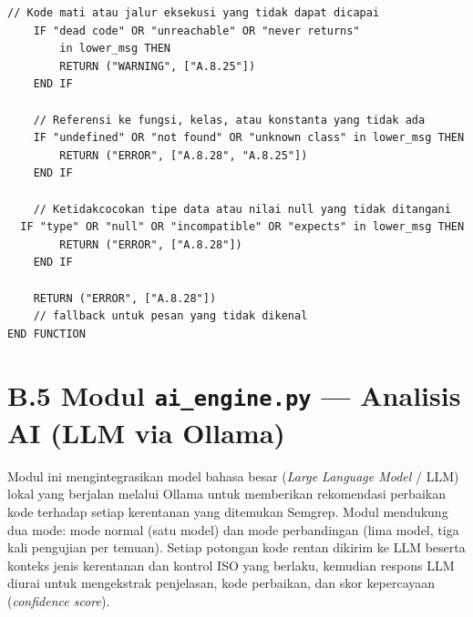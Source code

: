 \begin{lstlisting}[style=pseudocodestyle]
    // Kode mati atau jalur eksekusi yang tidak dapat dicapai
    IF "dead code" OR "unreachable" OR "never returns" 
        in lower_msg THEN
        RETURN ("WARNING", ["A.8.25"])
    END IF

    // Referensi ke fungsi, kelas, atau konstanta yang tidak ada
    IF "undefined" OR "not found" OR "unknown class" in lower_msg THEN
        RETURN ("ERROR", ["A.8.28", "A.8.25"])
    END IF

    // Ketidakcocokan tipe data atau nilai null yang tidak ditangani
  IF "type" OR "null" OR "incompatible" OR "expects" in lower_msg THEN
        RETURN ("ERROR", ["A.8.28"])
    END IF

    RETURN ("ERROR", ["A.8.28"])   
    // fallback untuk pesan yang tidak dikenal
END FUNCTION
\end{lstlisting}

\section*{B.5 Modul \texttt{ai\_engine.py} --- Analisis AI (LLM via Ollama)}

Modul ini mengintegrasikan model bahasa besar (\textit{Large Language Model} /
LLM) lokal yang berjalan melalui Ollama untuk memberikan rekomendasi perbaikan
kode terhadap setiap kerentanan yang ditemukan Semgrep. Modul mendukung dua
mode: mode normal (satu model) dan mode perbandingan (lima model, tiga kali
pengujian per temuan). Setiap potongan kode rentan dikirim ke LLM beserta
konteks jenis kerentanan dan kontrol ISO yang berlaku, kemudian respons LLM
diurai untuk mengekstrak penjelasan, kode perbaikan, dan skor kepercayaan
(\textit{confidence score}).

